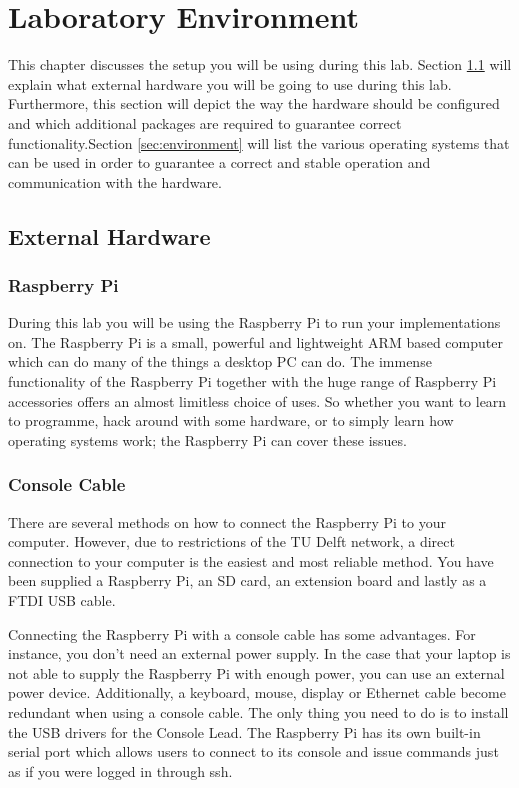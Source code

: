 \chapter{Laboratory Environment}\label{chap:config}
This chapter discusses the setup you will be using during this lab. Section \ref{sec:rasp} will explain what external hardware you will be going to use during this lab. Furthermore, this section will depict the way the hardware should be configured and which additional packages are required to guarantee correct functionality.Section \ref{sec:environment} will list the various operating systems that can be used in order to guarantee a correct and stable operation and communication with the hardware.\\ 

\section{External Hardware}
\label{sec:rasp}
\subsection*{Raspberry Pi}
During this lab you will be using the Raspberry Pi to run your implementations on. The Raspberry Pi is a small, powerful and lightweight ARM based computer which can do many of the things a desktop PC can do. The immense functionality of the Raspberry Pi together with the huge range of Raspberry Pi accessories offers an almost limitless choice of uses. So whether you want to learn to programme, hack around with some hardware, or to simply learn how operating systems work; the Raspberry Pi can cover these issues.

\subsection*{Console Cable}
There are several methods on how to connect the Raspberry Pi to your computer. However, due to restrictions of the TU Delft network, a direct connection to your computer is the easiest and most reliable method. You have been supplied a Raspberry Pi, an SD card, an extension board and lastly as a FTDI USB cable. 

Connecting the Raspberry Pi with a console cable has some advantages. For instance, you don't need an external power supply. In the case that your laptop is not able to supply the Raspberry Pi with enough power, you can use an external power device. Additionally, a keyboard, mouse, display or Ethernet cable become redundant when using a console cable. The only thing you need to do is to install the USB drivers for the Console Lead. The Raspberry Pi has its own built-in serial port which allows users to connect to its console and issue commands just as if you were logged in through ssh.

